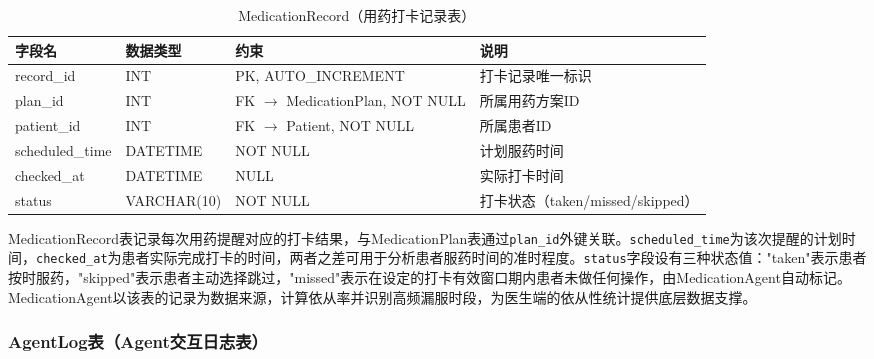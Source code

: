 \begin{table}[H]
\centering
\caption{MedicationRecord（用药打卡记录表）}
\label{tab:table-medicationrecord}
\begin{tabularx}{\textwidth}{|l|l|l|X|}
\hline
\textbf{字段名} & \textbf{数据类型} & \textbf{约束} & \textbf{说明} \\
\hline
record\_id & INT & PK, AUTO\_INCREMENT & 打卡记录唯一标识 \\
\hline
plan\_id & INT & FK $\rightarrow$ MedicationPlan, NOT NULL & 所属用药方案ID \\
\hline
patient\_id & INT & FK $\rightarrow$ Patient, NOT NULL & 所属患者ID \\
\hline
scheduled\_time & DATETIME & NOT NULL & 计划服药时间 \\
\hline
checked\_at & DATETIME & NULL & 实际打卡时间 \\
\hline
status & VARCHAR(10) & NOT NULL & 打卡状态（taken/missed/skipped） \\
\hline
\end{tabularx}
\end{table}

MedicationRecord表记录每次用药提醒对应的打卡结果，与MedicationPlan表通过\texttt{plan\_id}外键关联。\texttt{scheduled\_time}为该次提醒的计划时间，\texttt{checked\_at}为患者实际完成打卡的时间，两者之差可用于分析患者服药时间的准时程度。\texttt{status}字段设有三种状态值："taken"表示患者按时服药，"skipped"表示患者主动选择跳过，"missed"表示在设定的打卡有效窗口期内患者未做任何操作，由MedicationAgent自动标记。MedicationAgent以该表的记录为数据来源，计算依从率并识别高频漏服时段，为医生端的依从性统计提供底层数据支撑。


\subsubsection{AgentLog表（Agent交互日志表）}

